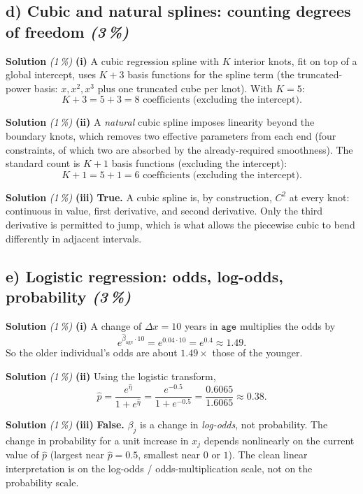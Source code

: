 \documentclass[11pt,a4paper]{article}
\newcommand{\subpoints}[1]{\textit{(#1\,\%)}}
\newcommand{\sol}{\noindent\textbf{Solution}}
\begin{document}
\subsection*{d) Cubic and natural splines: counting degrees of freedom \subpoints{3}}

\sol{} \subpoints{1} \textbf{(i)} A cubic regression spline with $K$ interior knots, fit on top of a global
intercept, uses $K+3$ basis functions for the spline term (the truncated-power basis: $x,x^2,x^3$ plus one
truncated cube per knot). With $K=5$:
$$K + 3 = 5 + 3 = \boxed{8} \text{ coefficients (excluding the intercept).}$$

\medskip
\sol{} \subpoints{1} \textbf{(ii)} A \emph{natural} cubic spline imposes linearity beyond the boundary knots,
which removes two effective parameters from each end (four constraints, of which two are absorbed by the
already-required smoothness). The standard count is $K+1$ basis functions (excluding the intercept):
$$K + 1 = 5 + 1 = \boxed{6} \text{ coefficients (excluding the intercept).}$$

\medskip
\sol{} \subpoints{1} \textbf{(iii)} \textbf{True.} A cubic spline is, by construction, $C^2$ at every knot:
continuous in value, first derivative, and second derivative. Only the third derivative is permitted to jump,
which is what allows the piecewise cubic to bend differently in adjacent intervals.

\subsection*{e) Logistic regression: odds, log-odds, probability \subpoints{3}}

\sol{} \subpoints{1} \textbf{(i)} A change of $\Delta x = 10$ years in $\texttt{age}$ multiplies the odds by
$$e^{\hat\beta_{\text{age}}\cdot 10} = e^{0.04\cdot 10} = e^{0.4} \approx \boxed{1.49}.$$
So the older individual's odds are about $1.49\times$ those of the younger.

\medskip
\sol{} \subpoints{1} \textbf{(ii)} Using the logistic transform,
$$\hat p = \frac{e^{\hat\eta}}{1 + e^{\hat\eta}} = \frac{e^{-0.5}}{1 + e^{-0.5}}
       = \frac{0.6065}{1.6065} \approx \boxed{0.38}.$$

\medskip
\sol{} \subpoints{1} \textbf{(iii)} \textbf{False.} $\beta_j$ is a change in \emph{log-odds}, not probability.
The change in probability for a unit increase in $x_j$ depends nonlinearly on the current value of $\hat p$
(largest near $\hat p=0.5$, smallest near $0$ or $1$). The clean linear interpretation is on the log-odds /
odds-multiplication scale, not on the probability scale.
\end{document}
